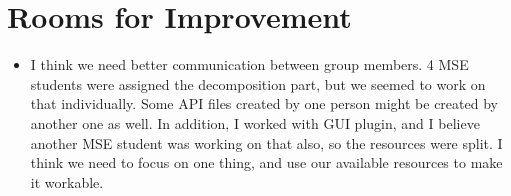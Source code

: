 \section*{Rooms for Improvement}

\begin{itemize}
   \item I think we need better communication between group members. 4 MSE students were assigned the decomposition part, but we seemed to work on that individually. Some API files created by one person might be created by another one as well. In addition, I worked with GUI plugin, and I believe another MSE student was working on that also, so the resources were split. I think we need to focus on one thing, and use our available resources to make it workable. 
\end{itemize}
  